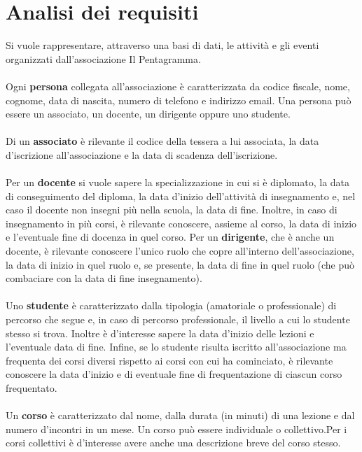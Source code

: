 \documentclass[12pt]{article}
\begin{document}
\section{Analisi dei requisiti}
	Si vuole rappresentare, attraverso una basi di dati, le attività e gli eventi organizzati dall'associazione Il Pentagramma.\\\\
	Ogni \textbf{persona} collegata all'associazione è caratterizzata da codice fiscale, nome, cognome, data di nascita, numero di telefono e indirizzo email. Una persona può essere un associato, un docente, un dirigente oppure uno studente.\\\\
	Di un \textbf{associato} è rilevante il codice della tessera a lui associata, la data d'iscrizione all'associazione e la data di scadenza dell'iscrizione.\\\\
	Per un \textbf{docente} si vuole sapere la specializzazione in cui si è diplomato, la data di conseguimento del diploma, la data d'inizio dell'attività di insegnamento e, nel caso il docente non insegni più nella scuola, la data di fine. Inoltre, in caso di insegnamento in più corsi, è rilevante conoscere, assieme al corso, la data di inizio e l'eventuale fine di docenza in quel corso. Per un \textbf{dirigente}, che è anche un docente, è rilevante conoscere l'unico ruolo che copre all'interno dell'associazione, la data di inizio in quel ruolo e, se presente, la data di fine in quel ruolo (che può combaciare con la data di fine insegnamento).\\\\
	Uno \textbf{studente} è caratterizzato dalla tipologia (amatoriale o professionale) di percorso che segue e, in caso di percorso professionale, il livello a cui lo studente stesso si trova. Inoltre è d'interesse sapere la data d'inizio delle lezioni e l'eventuale data di fine. Infine, se lo studente risulta iscritto all'associazione ma frequenta dei corsi diversi rispetto ai corsi con cui ha cominciato, è rilevante conoscere la data d'inizio e di eventuale fine di frequentazione di ciascun corso frequentato.\\\\
	Un \textbf{corso} è caratterizzato dal nome, dalla durata (in minuti) di una lezione e dal numero d'incontri in un mese. Un corso può essere individuale o collettivo.Per i corsi collettivi è d'interesse avere anche una descrizione breve del corso stesso.\\\\
\end{document}
